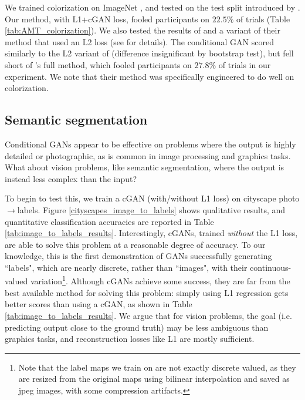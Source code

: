 \documentclass[10pt,twocolumn,letterpaper]{article}
\begin{document}
We trained colorization on ImageNet \cite{russakovsky2015imagenet}, and tested on the test split introduced by \cite{zhang2016colorful, larsson2016learning}. Our method, with L1+cGAN loss, fooled participants on $22.5\%$ of trials (Table \ref{tab:AMT_colorization}). We also tested the results of \cite{zhang2016colorful} and a variant of their method that used an L2 loss (see \cite{zhang2016colorful} for details). The conditional GAN scored similarly to the L2 variant of \cite{zhang2016colorful} (difference insignificant by bootstrap test), but fell short of \cite{zhang2016colorful}'s full method, which fooled participants on $27.8\%$ of trials in our experiment. We note that their method was specifically engineered to do well on colorization.



\subsection{Semantic segmentation}
Conditional GANs appear to be effective on problems where the output is highly detailed or photographic, as is common in image processing and graphics tasks. What about vision problems, like semantic segmentation, where the output is instead less complex than the input?

To begin to test this, we train a cGAN (with/without L1 loss) on cityscape photo$\rightarrow$labels. Figure \ref{cityscapes_image_to_labels} shows qualitative results, and quantitative classification accuracies are reported in Table \ref{tab:image_to_labels_results}. Interestingly, cGANs, trained \emph{without} the L1 loss, are able to solve this problem at a reasonable degree of accuracy. To our knowledge, this is the first demonstration of GANs successfully generating ``labels", which are nearly discrete, rather than ``images", with their continuous-valued variation\footnote{Note that the label maps we train on are not exactly discrete valued, as they are resized from the original maps using bilinear interpolation and saved as jpeg images, with some compression artifacts.}.
Although cGANs achieve some success, they are far from the best available method for solving this problem: simply using L1 regression gets better scores than using a cGAN, as shown in Table \ref{tab:image_to_labels_results}. We argue that for vision problems, the goal (i.e. predicting output close to the ground truth) may be less ambiguous than graphics tasks, and reconstruction losses like L1 are mostly sufficient.
\end{document}
